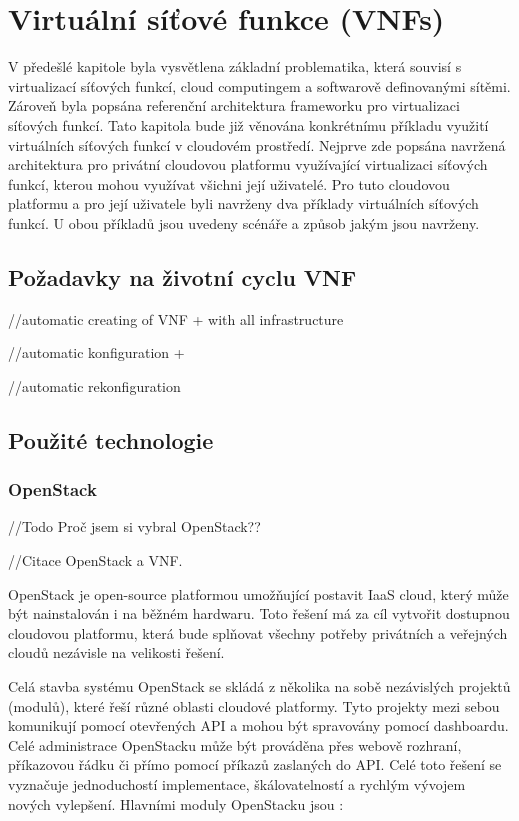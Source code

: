 \chapter{Virtuální síťové funkce (VNFs)}

V předešlé kapitole byla vysvětlena základní problematika, která souvisí s virtualizací síťových funkcí, cloud computingem a softwarově definovanými sítěmi. Zároveň byla popsána referenční architektura frameworku pro virtualizaci síťových funkcí. Tato kapitola bude již věnována konkrétnímu příkladu využití virtuálních síťových funkcí v cloudovém prostředí. Nejprve zde popsána navržená architektura pro privátní cloudovou platformu využívající virtualizaci síťových funkcí, kterou mohou využívat všichni její uživatelé. Pro tuto cloudovou platformu a pro její uživatele byli navrženy dva příklady virtuálních síťových funkcí. U obou příkladů jsou uvedeny scénáře a způsob jakým jsou navrženy.

\section{Požadavky na životní cyclu VNF}

//automatic creating of VNF + with all infrastructure

//automatic konfiguration + 

//automatic rekonfiguration

\section{Použité technologie}

\subsection{OpenStack}

//Todo Proč jsem si vybral OpenStack??

//Citace OpenStack a VNF.

OpenStack je open-source platformou umožňující postavit IaaS cloud, který může být nainstalován i na běžném hardwaru. Toto řešení má za cíl vytvořit dostupnou cloudovou platformu, která bude splňovat všechny potřeby privátních a veřejných cloudů nezávisle na velikosti řešení. \cite{OpenStack}

Celá stavba systému OpenStack se skládá z několika na sobě nezávislých projektů (modulů), které řeší různé oblasti cloudové platformy. Tyto projekty mezi sebou komunikují pomocí otevřených API a mohou být spravovány pomocí dashboardu. Celé administrace OpenStacku může být prováděna přes webově rozhraní, příkazovou řádku či přímo pomocí příkazů zaslaných do API. Celé toto řešení se vyznačuje jednoduchostí implementace, škálovatelností a rychlým vývojem nových vylepšení. Hlavními moduly OpenStacku jsou \cite{OpenStack} \cite{OpenStack2}:

